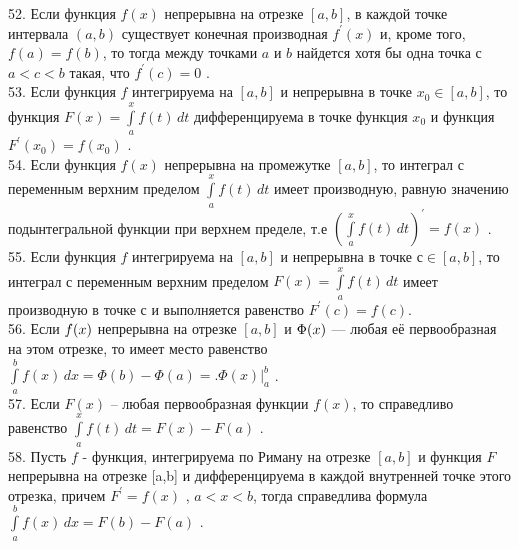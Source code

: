 \documentclass[12pt]{article}
\begin{document}
52. Если функция ${\displaystyle f(x)}$  непрерывна на отрезке ${\displaystyle [a,b]}$, в каждой точке интервала ${\displaystyle (a,b)}$ существует конечная производная ${\displaystyle f^{\prime}(x)}$ и, кроме того,${\displaystyle f(a)=f(b)}$, то тогда между точками ${\displaystyle a}$ и ${\displaystyle b}$ найдется хотя бы одна точка ${\displaystyle с}$ ${\displaystyle a<c<b}$ такая, что ${\displaystyle f^{\prime}(c)=0}$ .\\

53. Если функция ${\displaystyle f}$ интегрируема на ${\displaystyle [a,b]}$ и непрерывна в точке ${\displaystyle x_0 \in [a,b]}$, то функция ${\displaystyle F(x)=\int \limits _{a}^{x} f(t)\,dt}$  дифференцируема в точке функция ${\displaystyle x_0}$ и функция ${\displaystyle F^{\prime}(x_0)=f(x_0)}$ .\\

54. Если функция ${\displaystyle f(x)}$ непрерывна на промежутке ${\displaystyle [a,b]}$, то интеграл с переменным верхним пределом  ${\displaystyle \int \limits _{a}^{x} f(t)\,dt}$ имеет производную, равную значению подынтегральной функции при верхнем пределе, т.е ${\displaystyle \left(\int \limits _{a}^{x} f(t)\,dt\right)^{\prime}=f(x)}$ .\\

55. Если функция ${\displaystyle f}$ интегрируема на ${\displaystyle [a,b]}$ и непрерывна в точке ${\displaystyle с \in [a,b]}$, то интеграл с переменным верхним пределом ${\displaystyle F(x)=\int \limits _{a}^{x} f(t)\, dt}$ имеет производную в точке ${\displaystyle с}$ и выполняется равенство ${\displaystyle F^{\prime}(c)=f(c)}$.\\

56. Если ${\displaystyle \textstyle f(x)}$ непрерывна на отрезке ${\displaystyle \left[a,b\right]}$  и ${\displaystyle \textstyle \Phi (x)}$ — любая её первообразная на этом отрезке, то имеет место равенство ${\displaystyle \int \limits _a^b f(x)\,dx=\Phi (b)-\Phi (a)={\Bigg .}\Phi (x){\Bigg |}_{a}^{b}}$ .\\

57. Если  ${\displaystyle F (x)}$ – любая первообразная функции ${\displaystyle f (x)}$,  то справедливо равенство ${\displaystyle \int \limits _a^x f(t)\,dt=F(x)-F(a)}$ .\\

58. Пусть ${\displaystyle f}$ - функция, интегрируема по Риману на отрезке ${\displaystyle [a,b]}$ и функция ${\displaystyle F}$ непрерывна на отрезке [a,b] и дифференцируема в каждой внутренней точке этого отрезка, причем ${\displaystyle F^{\prime}=f(x)}$ , ${\displaystyle a<x<b}$, тогда справедлива формула ${\displaystyle \int \limits _{a}^{b} f(x) \, dx=F(b)-F(a)}$ .\\
\end{document}
